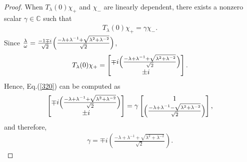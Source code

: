 \documentclass[a4paper,12pt]{article}
\theoremstyle{plain}
\theoremstyle{definition}
\theoremstyle{definition}
\begin{document}
\begin{proof}
When $T_{\lambda}(0)\chi_{+}$ and $\chi_{-}$ are linearly dependent, there exists a nonzero scalar $\gamma \in \mathbb{C}$ such that 
\begin{eqnarray}
\label{320}
T_{\lambda}(0)\chi_{+} = \gamma \chi_{-}. 
\end{eqnarray}
Since $\frac{\lambda}{\omega}=\frac{-1\mp i}{\sqrt{2}}\Bigl( \frac{-\lambda +\lambda^{-1}+\sqrt{\lambda^2+\lambda^{-2}}}{\sqrt{2}} \Bigr)$,
\begin{eqnarray}
T_{\lambda}(0)\chi_{+}=
\begin{bmatrix}
   \mp i\Bigl(\frac{-\lambda +\lambda^{-1}+\sqrt{\lambda^2+\lambda^{-2}}}{\sqrt{2}}\Bigr) \\
   \pm i
\end{bmatrix}. \nonumber 
\end{eqnarray}
Hence, Eq.(\ref{320}) can be computed as
\begin{eqnarray}
\begin{bmatrix}
   \mp i\Bigl(\frac{-\lambda +\lambda^{-1}+\sqrt{\lambda^2+\lambda^{-2}}}{\sqrt{2}}\Bigr) \\
   \pm i
\end{bmatrix} \nonumber 
=\gamma 
\begin{bmatrix}
   1 \\
    \Bigl(\frac{-\lambda +\lambda^{-1}-\sqrt{\lambda^2+\lambda^{-2}}}{\sqrt{2}}
    \Bigr)
\end{bmatrix},
\end{eqnarray}
and therefore,
\begin{align*}
\gamma  = \mp i\left(\frac{-\lambda +\lambda^{-1}+\sqrt{\lambda^2+\lambda^{-2}}}{\sqrt{2}}\right).
\end{align*}


\end{proof}
\end{document}
